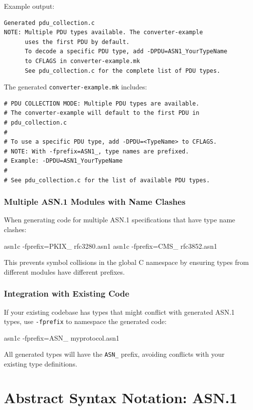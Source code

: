 \documentclass[english,oneside,12pt]{book}
\begin{document}
Example output:
\begin{verbatim}
Generated pdu_collection.c
NOTE: Multiple PDU types available. The converter-example 
      uses the first PDU by default.
      To decode a specific PDU type, add -DPDU=ASN1_YourTypeName 
      to CFLAGS in converter-example.mk
      See pdu_collection.c for the complete list of PDU types.
\end{verbatim}

The generated \texttt{converter-example.mk} includes:
\begin{verbatim}
# PDU COLLECTION MODE: Multiple PDU types are available.
# The converter-example will default to the first PDU in 
# pdu_collection.c
#
# To use a specific PDU type, add -DPDU=<TypeName> to CFLAGS.
# NOTE: With -fprefix=ASN1_, type names are prefixed.
# Example: -DPDU=ASN1_YourTypeName
#
# See pdu_collection.c for the list of available PDU types.
\end{verbatim}

\subsection*{Multiple ASN.1 Modules with Name Clashes}

When generating code for multiple ASN.1 specifications that have type name clashes:

\begin{bash}
asn1c -fprefix=PKIX_ rfc3280.asn1
asn1c -fprefix=CMS_ rfc3852.asn1
\end{bash}

This prevents symbol collisions in the global C namespace by ensuring types from 
different modules have different prefixes.

\subsection*{Integration with Existing Code}

If your existing codebase has types that might conflict with generated ASN.1 types, 
use \texttt{-fprefix} to namespace the generated code:

\begin{bash}
asn1c -fprefix=ASN_ myprotocol.asn1
\end{bash}

All generated types will have the \texttt{ASN\_} prefix, avoiding conflicts with your 
existing type definitions.

\chapter{\label{chap:Abstract-Syntax-Notation}Abstract Syntax Notation: ASN.1}
\end{document}
